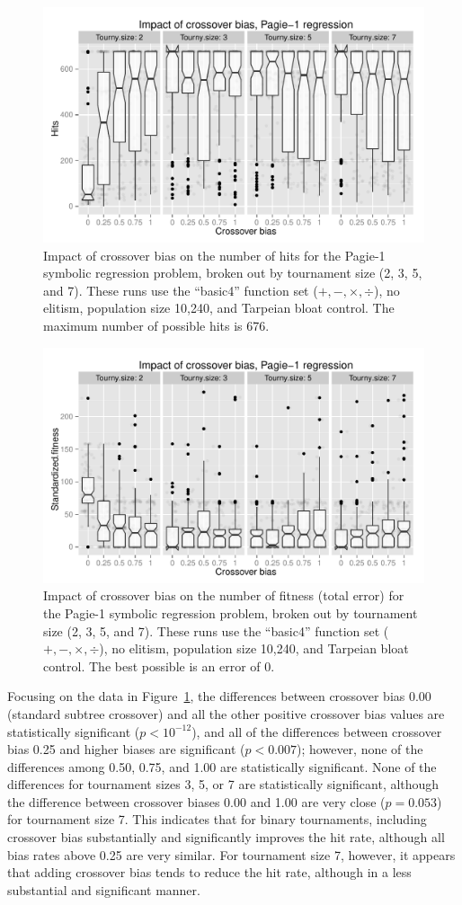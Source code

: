 \documentclass{sig-alternate}
\begin{document}
\begin{figure}
\centering
\includegraphics[width=0.45 \textwidth]{Plots/Pagie_1_strong_Hits_vs_Bias_Tournys_FunctionSet.pdf}
\caption{Impact of crossover bias on the number of hits for the Pagie-1 symbolic regression problem, broken out by 
tournament size (2, 3, 5, and 7). These runs use the ``basic4'' function set ($+, -, \times, \div$), no elitism, 
population size 10,240, and Tarpeian bloat control. The maximum number of possible hits is 676.}
\label{fig:Pagie1StrongHits_Bias_Tournys_FunctionSet}
\end{figure}

\begin{figure}
\centering
\includegraphics[width=0.45 \textwidth]{Plots/Pagie_1_strong_Fitness_vs_Bias_Tournys_FunctionSet.pdf}
\caption{Impact of crossover bias on the number of fitness (total error) for the Pagie-1 symbolic regression problem, 
broken out by tournament size (2, 3, 5, and 7). These runs use the ``basic4'' function set ($+, -, \times, \div$), no 
elitism, population size 10,240, and Tarpeian bloat control. The best possible is an error of 0.}
\label{fig:Pagie1StrongFitness_Bias_Tournys_FunctionSet}
\end{figure}

Focusing on the data in Figure~\ref{fig:Pagie1StrongHits_Bias_Tournys_FunctionSet}, the differences between crossover
bias 0.00 (standard subtree crossover) and all the other positive crossover bias values are statistically significant
($p<10^{-12}$), and all of the differences between crossover bias 0.25 and higher biases are significant ($p<0.007$);
however, none of the differences among 0.50, 0.75, and 1.00 are statistically significant. None of the differences for
tournament sizes 3, 5, or 7 are statistically significant, although the difference between crossover biases 0.00 and
1.00 are very close ($p=0.053$) for tournament size 7. This indicates that for binary tournaments, including crossover
bias substantially and significantly improves the hit rate, although all bias rates above 0.25 are very similar. For
tournament size 7, however, it appears that adding crossover bias tends to reduce the hit rate, although in a less
substantial and significant manner.
\end{document}
